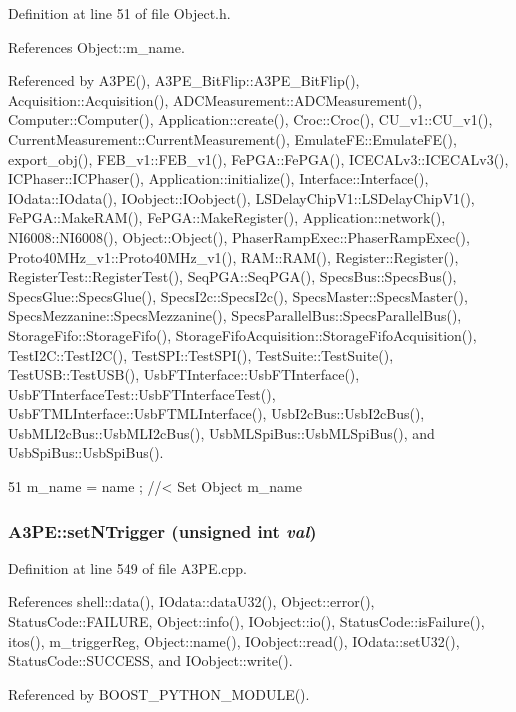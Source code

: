 Definition at line 51 of file Object.h.

References Object::m\_\-name.

Referenced by A3PE(), A3PE\_\-BitFlip::A3PE\_\-BitFlip(), Acquisition::Acquisition(), ADCMeasurement::ADCMeasurement(), Computer::Computer(), Application::create(), Croc::Croc(), CU\_\-v1::CU\_\-v1(), CurrentMeasurement::CurrentMeasurement(), EmulateFE::EmulateFE(), export\_\-obj(), FEB\_\-v1::FEB\_\-v1(), FePGA::FePGA(), ICECALv3::ICECALv3(), ICPhaser::ICPhaser(), Application::initialize(), Interface::Interface(), IOdata::IOdata(), IOobject::IOobject(), LSDelayChipV1::LSDelayChipV1(), FePGA::MakeRAM(), FePGA::MakeRegister(), Application::network(), NI6008::NI6008(), Object::Object(), PhaserRampExec::PhaserRampExec(), Proto40MHz\_\-v1::Proto40MHz\_\-v1(), RAM::RAM(), Register::Register(), RegisterTest::RegisterTest(), SeqPGA::SeqPGA(), SpecsBus::SpecsBus(), SpecsGlue::SpecsGlue(), SpecsI2c::SpecsI2c(), SpecsMaster::SpecsMaster(), SpecsMezzanine::SpecsMezzanine(), SpecsParallelBus::SpecsParallelBus(), StorageFifo::StorageFifo(), StorageFifoAcquisition::StorageFifoAcquisition(), TestI2C::TestI2C(), TestSPI::TestSPI(), TestSuite::TestSuite(), TestUSB::TestUSB(), UsbFTInterface::UsbFTInterface(), UsbFTInterfaceTest::UsbFTInterfaceTest(), UsbFTMLInterface::UsbFTMLInterface(), UsbI2cBus::UsbI2cBus(), UsbMLI2cBus::UsbMLI2cBus(), UsbMLSpiBus::UsbMLSpiBus(), and UsbSpiBus::UsbSpiBus().


\begin{DoxyCode}
51 { m_name  = name  ; } //< Set Object m_name
\end{DoxyCode}
\hypertarget{classA3PE_a81db44ddfc42b67ed08756b113b8e122}{
\subsubsection[{setNTrigger}]{ A3PE::setNTrigger (unsigned int {\em val})}}
\label{classA3PE_a81db44ddfc42b67ed08756b113b8e122}


Definition at line 549 of file A3PE.cpp.

References shell::data(), IOdata::dataU32(), Object::error(), StatusCode::FAILURE, Object::info(), IOobject::io(), StatusCode::isFailure(), itos(), m\_\-triggerReg, Object::name(), IOobject::read(), IOdata::setU32(), StatusCode::SUCCESS, and IOobject::write().

Referenced by BOOST\_\-PYTHON\_\-MODULE().


